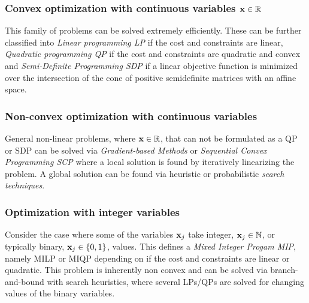 \subsubsection{Convex optimization with continuous variables $\textbf{x} \in \mathbb{R}$}
This family of problems can be solved extremely efficiently.
These can be further classified into \emph{Linear programming LP} if the cost and constraints are linear,
\emph{Quadratic programming QP} if the cost and constraints are quadratic and convex and \emph{Semi-Definite Programming SDP} if a linear objective function is minimized over the intersection of the cone of positive semidefinite matrices with an affine space.

\subsubsection{Non-convex optimization with continuous variables}
General non-linear problems, where $\textbf{x} \in \mathbb{R}$, that can not be formulated as a QP or SDP can be solved via \emph{Gradient-based Methods} or \emph{Sequential Convex Programming SCP} where a local solution is found by iteratively linearizing the problem. A global solution can be found via heuristic or probabilistic \emph{search techniques}.  

\subsubsection{Optimization with integer variables}
Consider the case where some of the variables $\textbf{x}_j$ take integer, $\textbf{x}_j \in \mathbb{N}$, or typically binary, $\textbf{x}_j \in \{0,1\}$, values.
This defines a \emph{Mixed Integer Progam MIP}, namely MILP or MIQP depending on if the cost and constraints are linear or quadratic. This problem is inherently non convex and can be solved via branch-and-bound with search heuristics, where several LPs/QPs are solved for changing values of the binary variables.



